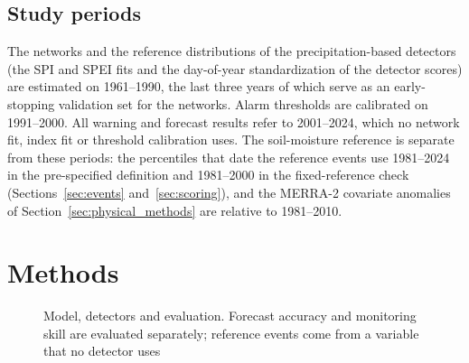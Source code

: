 \documentclass[pdflatex,sn-mathphys-ay]{sn-jnl}
\theoremstyle{thmstyletwo}
\begin{document}
\subsection{Study periods}
The networks and the reference distributions of the precipitation-based detectors (the SPI and SPEI
fits and the day-of-year standardization of the detector scores) are estimated on 1961--1990, the last
three years of which serve as an early-stopping validation set for the networks. Alarm thresholds are
calibrated on 1991--2000. All warning and forecast results refer to 2001--2024, which no network fit,
index fit or threshold calibration uses. The soil-moisture reference is separate from these periods:
the percentiles that date the reference events use 1981--2024 in the pre-specified definition and
1981--2000 in the fixed-reference check (Sections~\ref{sec:events} and~\ref{sec:scoring}), and the
MERRA-2 covariate anomalies of Section~\ref{sec:physical_methods} are relative to 1981--2010.

\section{Methods}\label{sec:methods}
\begin{figure}[tbp]
\centering
{}
\caption{Model, detectors and evaluation. Forecast accuracy and monitoring skill are evaluated
separately; reference events come from a variable that no detector uses}\label{fig:workflow}
\end{figure}
\end{document}
